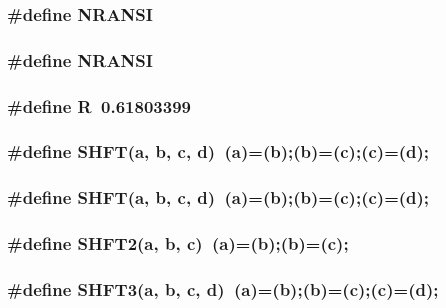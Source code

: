 \subsubsection{\setlength{\rightskip}{0pt plus 5cm}\#define NRANSI}\label{nrmin_8c_c35ec264c922c9b83f2b3d79cb8f5d93}


\subsubsection{\setlength{\rightskip}{0pt plus 5cm}\#define NRANSI}\label{nrmin_8c_c35ec264c922c9b83f2b3d79cb8f5d93}


\subsubsection{\setlength{\rightskip}{0pt plus 5cm}\#define R~0.61803399}\label{nrmin_8c_5c71a5e59a53413cd6c270266d63b031}


\subsubsection{\setlength{\rightskip}{0pt plus 5cm}\#define SHFT(a, b, c, d)~(a)=(b);(b)=(c);(c)=(d);}\label{nrmin_8c_199afb41152cc9a1c32d60f129a40ea5}


\subsubsection{\setlength{\rightskip}{0pt plus 5cm}\#define SHFT(a, b, c, d)~(a)=(b);(b)=(c);(c)=(d);}\label{nrmin_8c_199afb41152cc9a1c32d60f129a40ea5}


\subsubsection{\setlength{\rightskip}{0pt plus 5cm}\#define SHFT2(a, b, c)~(a)=(b);(b)=(c);}\label{nrmin_8c_4a68f16b0ff909c9a2db33ed91c173f3}


\subsubsection{\setlength{\rightskip}{0pt plus 5cm}\#define SHFT3(a, b, c, d)~(a)=(b);(b)=(c);(c)=(d);}\label{nrmin_8c_a2fe0a6eb610d7d50048c62747994d4a}


